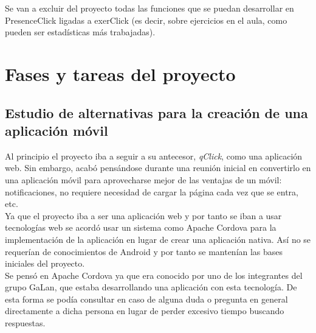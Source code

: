

Se van a excluir del proyecto todas las funciones que se puedan desarrollar en PresenceClick ligadas a exerClick (es decir, sobre ejercicios en el aula, como pueden ser estadísticas más trabajadas).\\


\section{Fases y tareas del proyecto}

\subsection{Estudio de alternativas para la creación de una aplicación móvil}

Al principio el proyecto iba a seguir a su antecesor, \textit{qClick}, como una aplicación web. Sin embargo, acabó pensándose durante una reunión inicial en convertirlo en una aplicación móvil para aprovecharse mejor de las ventajas de un móvil: notificaciones, no requiere necesidad de cargar la página cada vez que se entra, etc.\\

Ya que el proyecto iba a ser una aplicación web y por tanto se iban a usar tecnologías web se acordó usar un sistema como Apache Cordova para la implementación de la aplicación en lugar de crear una aplicación nativa. Así no se requerían de conocimientos de Android y por tanto se mantenían las bases iniciales del proyecto.\\

Se pensó en Apache Cordova ya que era conocido por uno de los integrantes del grupo GaLan, que estaba desarrollando una aplicación con esta tecnología. De esta forma se podía consultar en caso de alguna duda o pregunta en general directamente a dicha persona en lugar de perder excesivo tiempo buscando respuestas.\\

